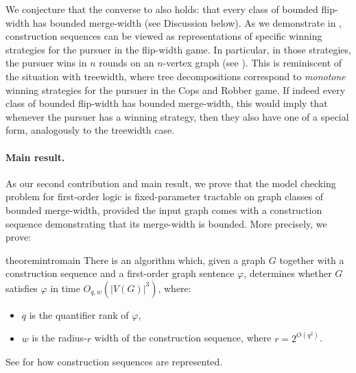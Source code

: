 \documentclass[11pt]{article}
\newcommand{\sz}[1]{\todo[color=pink!40]{sz: #1}}
\theoremstyle{remark}
\def\phi{\varphi}
\begin{document}
We conjecture that
the converse to  also holds: that every class of bounded flip-width has bounded merge-width (see Discussion below).
As we demonstrate in , construction sequences can be
viewed as representations of specific winning strategies for the pursuer in the flip-width game. In particular,
in those strategies, the pursuer wins in $n$ rounds on an $n$-vertex graph (see ).
This is reminiscent of the situation with treewidth, where tree decompositions correspond to \emph{monotone} winning strategies for the pursuer in the Cops and Robber game.
If indeed every class of bounded flip-width
has bounded merge-width, this would imply that whenever
the pursuer has a winning strategy, then
they also have one of a special form, analogously to the treewidth case.



\paragraph{Main result.}
As our second contribution and  main result,
we prove that the model checking problem for first-order logic
is fixed-parameter tractable on graph classes of bounded merge-width,
provided the input graph comes with a construction sequence demonstrating that its merge-width is bounded.
More precisely, we prove:

\begin{restatable}{theorem}{intromain}\label{thm:main}
There is an algorithm which,
given a graph $G$ together with a construction sequence
and a first-order graph sentence $\phi$,
determines whether $G$ satisfies $\phi$
in time
\(O_{q,w}(|V(G)|^3)\),
where:
\begin{itemize}
    \item $q$ is the quantifier rank of $\phi$,
    \item $w$ is the radius-\(r\) width of the construction sequence, where  $r=2^{O(q^2)}$.
\end{itemize}
\end{restatable}
\noindent 
See  for how construction sequences are represented.
\end{document}
